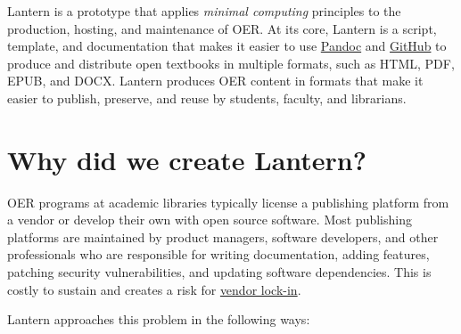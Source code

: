 \documentclass[
  11pt,
  openany]{book}
\begin{document}
Lantern is a prototype that applies \emph{minimal computing} principles to the
production, hosting, and maintenance of OER. At its core, Lantern is a script,
template, and documentation that makes it easier to use
\href{http://pandoc.org/}{Pandoc} and \href{https://github.com/}{GitHub} to
produce and distribute open textbooks in multiple formats, such as HTML, PDF,
EPUB, and DOCX. Lantern produces OER content in formats that make it easier to
publish, preserve, and reuse by students, faculty, and librarians.

\hypertarget{why-did-we-create-lantern}{%
\section{Why did we create Lantern?}\label{why-did-we-create-lantern}}

OER programs at academic libraries typically license a publishing platform
from a vendor or develop their own with open source software. Most publishing
platforms are maintained by product managers, software developers, and other
professionals who are responsible for writing documentation, adding features,
patching security vulnerabilities, and updating software dependencies. This is
costly to sustain and creates a risk for
\href{https://en.wikipedia.org/wiki/Vendor_lock-in}{vendor lock-in}.

Lantern approaches this problem in the following ways:
\end{document}
